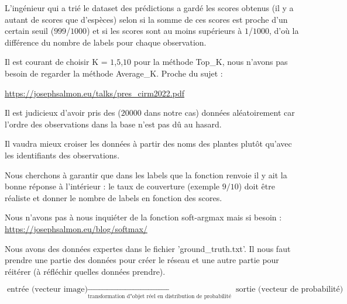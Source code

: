 \documentclass[french]{article}
\begin{document}
\vspace{0.2cm}

L'ingénieur qui a trié le dataset des prédictions a gardé les scores obtenus (il y a autant de scores que d'espèces) selon si la somme de ces scores est proche d'un certain seuil ($999$/$1000$) et si les scores sont au moins supérieurs à $1$/$1000$, d'où la différence du nombre de labels pour chaque observation.

\vspace{0.2cm}

Il est courant de choisir K = $1$,$5$,$10$ pour la méthode Top\_K, nous n'avons pas besoin de regarder la méthode Average\_K. Proche du sujet :

\url{https://josephsalmon.eu/talks/pres_cirm2022.pdf}

\vspace{0.2cm}

Il est judicieux d'avoir pris des ($20 000$ dans notre cas) données aléatoirement car l'ordre des observations dans la base n'est pas dû au hasard.

\vspace{0.2cm}

Il vaudra mieux croiser les données à partir des noms des plantes plutôt qu'avec les identifiants des observations.

\vspace{0.2cm}

Nous cherchons à garantir que dans les labels que la fonction renvoie il y ait la bonne réponse à l'intérieur : le taux de couverture (exemple $9/10$) doit être réaliste et donner le nombre de labels en fonction des scores.

\vspace{0.2cm}

Nous n'avons pas à nous inquiéter de la fonction soft-argmax mais si besoin :
\url{https://josephsalmon.eu/blog/softmax/}

\vspace{0.2cm}

Nous avons des données expertes dans le fichier 'ground\_truth.txt'. Il nous faut prendre une partie des données pour créer le réseau et une autre partie pour réitérer (à réfléchir quelles données prendre).

\vspace{0.2cm}

$$ \text{entrée (vecteur image)} \underset{\text{transformation d"objet réel en distribution de probabilité }}\longrightarrow \text{ sortie (vecteur de probabilité)} $$
\end{document}
